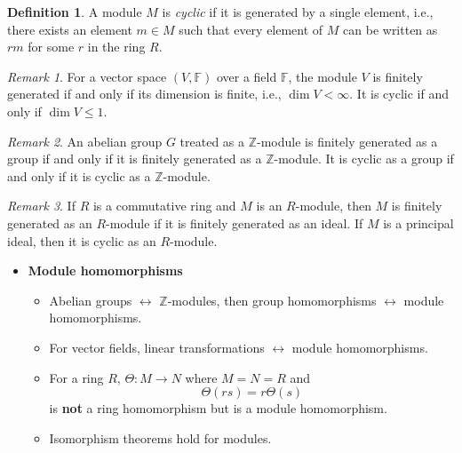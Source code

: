 \documentclass[11pt]{article}
\theoremstyle{definition}
\newtheorem{definition}{Definition}[section]
\theoremstyle{remark}
\newtheorem{remark}{Remark}[section]
\begin{document}
\begin{definition}\label{def:cyclic_module}
A module $M$ is \textit{cyclic} if it is generated by a single element, i.e., there exists an element $m \in M$ such that every element of $M$ can be written as $rm$ for some $r$ in the ring $R$.
\end{definition}

\begin{remark}\label{rem:vector_space}
For a vector space $(V, \mathbb{F})$ over a field $\mathbb{F}$, the module $V$ is finitely generated if and only if its dimension is finite, i.e., $\dim V < \infty$. It is cyclic if and only if $\dim V \leq 1$.
\end{remark}

\begin{remark}\label{rem:abelian_group}
An abelian group $G$ treated as a $\mathbb{Z}$-module is finitely generated as a group if and only if it is finitely generated as a $\mathbb{Z}$-module. It is cyclic as a group if and only if it is cyclic as a $\mathbb{Z}$-module.
\end{remark}

\begin{remark}\label{rem:ring_ideal}
If $R$ is a commutative ring and $M$ is an $R$-module, then $M$ is finitely generated as an $R$-module if it is finitely generated as an ideal. If $M$ is a principal ideal, then it is cyclic as an $R$-module.
\end{remark}

\begin{itemize}
    \item \textbf{Module homomorphisms}

    \begin{itemize}
        \item Abelian groups $\leftrightarrow$ $\mathbb{Z}$-modules, then group homomorphisms $\leftrightarrow$ module homomorphisms.
    \end{itemize}

    \begin{itemize}
        \item For vector fields, linear transformations $\leftrightarrow$ module homomorphisms.
    \end{itemize}

    \begin{itemize}
        \item For a ring $R$, $\Theta: M \rightarrow N$ where $M = N = R$ and
        \[
        \Theta(rs) = r\Theta(s)
        \]
        is \textbf{not} a ring homomorphism but is a module homomorphism.
    \end{itemize}

    \begin{itemize}
        \item Isomorphism theorems hold for modules.
    \end{itemize}
\end{itemize}

\end{document}
